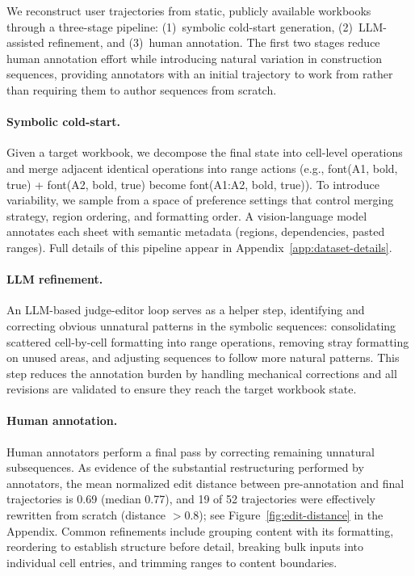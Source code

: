 \documentclass{article}
\theoremstyle{plain}
\theoremstyle{definition}
\theoremstyle{remark}
\begin{document}
We reconstruct user trajectories from static, publicly available workbooks~\cite{singh2023cornet} through a three-stage pipeline: (1)~symbolic cold-start generation, (2)~LLM-assisted refinement, and (3)~human annotation. The first two stages reduce human annotation effort while introducing natural variation in construction sequences, providing annotators with an initial trajectory to work from rather than requiring them to author sequences from scratch.

\paragraph{Symbolic cold-start.}
Given a target workbook, we decompose the final state into cell-level operations and merge adjacent identical operations into range actions (e.g., \textsf{\small font(A1, bold, true)} + \textsf{\small font(A2, bold, true)} become \textsf{\small font(A1:A2, bold, true)}). To introduce variability, we sample from a space of preference settings that control merging strategy, region ordering, and formatting order.
A vision-language model annotates each sheet with semantic metadata (regions, dependencies, pasted ranges). Full details of this pipeline appear in Appendix~\ref{app:dataset-details}.

\paragraph{LLM refinement.}
An LLM-based judge-editor loop serves as a helper step, identifying and correcting obvious unnatural patterns in the symbolic sequences: consolidating scattered cell-by-cell formatting into range operations, removing stray formatting on unused areas, and adjusting sequences to follow more natural patterns.
This step reduces the annotation burden by handling mechanical corrections and all revisions are validated to ensure they reach the target workbook state.

\paragraph{Human annotation.}
Human annotators perform a final pass by correcting remaining unnatural subsequences.
As evidence of the substantial restructuring performed by annotators, the mean normalized edit distance between pre-annotation and final trajectories is 0.69 (median 0.77), and 19 of 52 trajectories were effectively rewritten from scratch (distance ${>}0.8$); see Figure~\ref{fig:edit-distance} in the Appendix.
Common refinements include grouping content with its formatting, reordering to establish structure before detail, breaking bulk inputs into individual cell entries, and trimming ranges to content boundaries.
\end{document}

